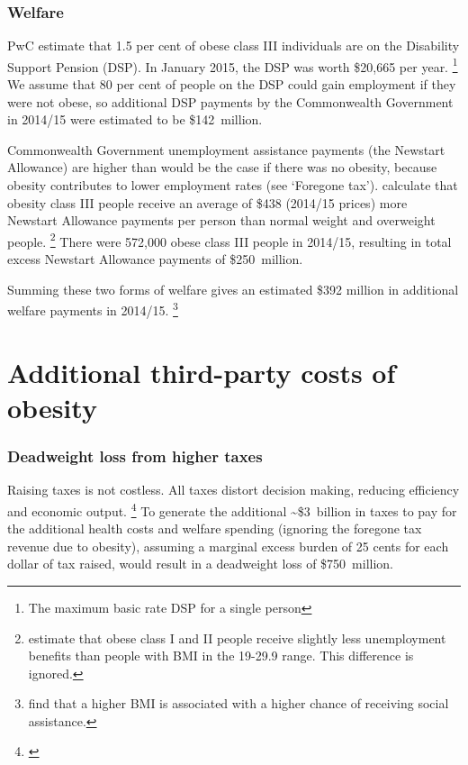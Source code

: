 \documentclass[embargoed]{grattan}
\begin{document}
\subsubsection{Welfare}\label{welfare}

PwC estimate that 1.5 per cent of obese class III individuals are on the Disability Support Pension (DSP).
In January 2015, the DSP was worth \$20,665 per year.%
\footnote{The maximum basic rate DSP for a single person} We assume that 80 per cent of people on the DSP could gain employment if they were not obese, so additional DSP payments by the Commonwealth Government in 2014/15 were estimated to be \$142~million.

Commonwealth Government unemployment assistance payments (the Newstart Allowance) are higher than would be the case if there was no obesity, because obesity contributes to lower employment rates (see `Foregone tax'). \textcite{Colagiuri2010costoverweightobesity} calculate that obesity class III people receive an average of \$438 (2014/15 prices) more Newstart Allowance payments per person than normal weight and overweight people.%
\footnote{\textcite{Colagiuri2010costoverweightobesity} estimate that obese class I and II people receive slightly less unemployment benefits than people with BMI in the 19-29.9 range.
This difference is ignored.} There were 572,000 obese class III people in 2014/15, resulting in total excess Newstart Allowance payments of \$250~million.

Summing these two forms of welfare gives an estimated \$392 million in additional welfare payments in 2014/15.%
\footnote{\textcite{Boeckerman2016EffectWeightLabor} find that a higher BMI is associated with a higher chance of receiving social assistance.}

\section{Additional third-party costs of obesity }\label{additional-third-party-costs-of-obesity}

\subsubsection{Deadweight loss from higher taxes}\label{deadweight-loss-from-higher-taxes}

Raising taxes is not costless.
All taxes distort decision making, reducing efficiency and economic output.%
\footnote{\textcites[][Box~1]{Daley2015Propertytaxes}{Freebairn2010Taxationobesity}} To generate the additional \textasciitilde{}\$3~billion in taxes to pay for the additional health costs and welfare spending (ignoring the foregone tax revenue due to obesity), assuming a marginal excess burden of 25 cents for each dollar of tax raised, would result in a deadweight loss of \$750~million.
\end{document}
